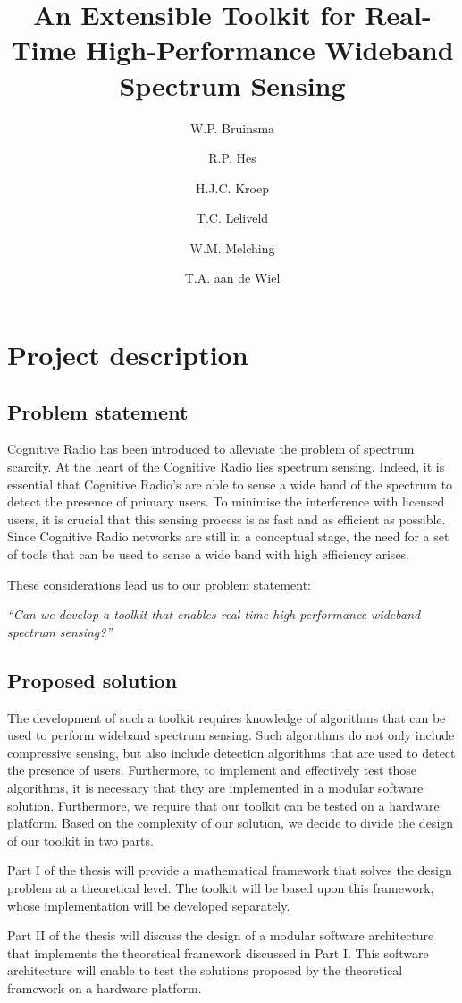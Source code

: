 \documentclass[a4paper, openany, oneside]{memoir}
\title{An Extensible Toolkit for Real-Time High-Performance Wideband Spectrum Sensing}
\author{W.P. Bruinsma \and R.P. Hes \and H.J.C. Kroep \and T.C. Leliveld \and W.M. Melching \and T.A. aan de Wiel}
\begin{document}
\chapter{Project description} \label{cha:problem_statement}
\section{Problem statement}

Cognitive Radio has been introduced to alleviate the problem of spectrum scarcity.
At the heart of the Cognitive Radio lies spectrum sensing. Indeed, it is essential that Cognitive Radio's are able to sense a wide band of the spectrum to detect the presence of primary users. To minimise the interference with licensed users, it is crucial that this sensing process is as fast and as efficient as possible. Since Cognitive Radio networks are still in a conceptual stage, the need for a set of tools that can be used to sense a wide band with high efficiency arises.

These considerations lead us to our problem statement:
\begin{center}
\emph{``Can we develop a toolkit that enables real-time high-performance wideband spectrum sensing?''}
\end{center}

\section{Proposed solution}
The development of such a toolkit requires knowledge of algorithms that can be used to perform wideband spectrum sensing. Such algorithms do not only include compressive sensing, but also include detection algorithms that are used to detect the presence of users. Furthermore, to implement and effectively test those algorithms, it is necessary that they are implemented in a modular software solution. Furthermore, we require that our toolkit can be tested on a hardware platform. Based on the complexity of our solution, we decide to divide the design of our toolkit in two parts.

Part I of the thesis will provide a mathematical framework that solves the design problem at a theoretical level. The toolkit will be based upon this framework, whose implementation will be developed separately.

Part II of the thesis will discuss the design of a modular software architecture that  implements the theoretical framework discussed in Part I. This software architecture will enable to test the solutions proposed by the theoretical framework on a hardware platform.
\end{document}
